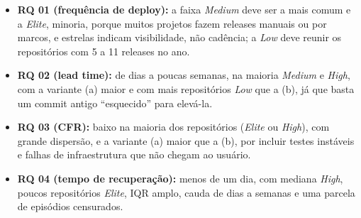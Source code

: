 \begin{itemize}
\item \textbf{RQ 01 (frequência de deploy):} a faixa \textit{Medium} deve ser a mais comum e a \textit{Elite}, minoria, porque muitos projetos fazem releases manuais ou por marcos, e estrelas indicam visibilidade, não cadência; a \textit{Low} deve reunir os repositórios com 5 a 11 releases no ano.
\item \textbf{RQ 02 (lead time):} de dias a poucas semanas, na maioria \textit{Medium} e \textit{High}, com a variante (a) maior e com mais repositórios \textit{Low} que a (b), já que basta um commit antigo ``esquecido'' para elevá-la.
\item \textbf{RQ 03 (CFR):} baixo na maioria dos repositórios (\textit{Elite} ou \textit{High}), com grande dispersão, e a variante (a) maior que a (b), por incluir testes instáveis e falhas de infraestrutura que não chegam ao usuário.
\item \textbf{RQ 04 (tempo de recuperação):} menos de um dia, com mediana \textit{High}, poucos repositórios \textit{Elite}, IQR amplo, cauda de dias a semanas e uma parcela de episódios censurados.
\end{itemize}
